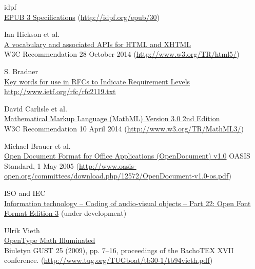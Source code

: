 \begin{thebibliography}{25}
idpf \\
\href{http://idpf.org/epub/30}{EPUB 3 Specifications}
(\href{http://idpf.org/epub/30}{http://idpf.org/epub/30})

Ian Hickson et al. \\
\href{http://www.w3.org/TR/html5/}{A vocabulary and associated APIs for HTML and XHTML} \\
W3C Recommendation 28 October 2014 (\href{http://www.w3.org/TR/html5/}{http://www.w3.org/TR/html5/})

S. Bradner \\
\href{http://www.ietf.org/rfc/rfc2119.txt}{Key words for use in RFCs to Indicate Requirement Levels} \\
\href{http://www.ietf.org/rfc/rfc2119.txt}{http://www.ietf.org/rfc/rfc2119.txt}

David Carlisle et al. \\
\href{http://www.w3.org/TR/MathML3/}{Mathematical Markup Language (MathML) Version 3.0 2nd Edition} \\
W3C Recommendation 10 April 2014 (\href{http://www.w3.org/TR/MathML3/}{http://www.w3.org/TR/MathML3/})

Michael Brauer et al. \\
\href{http://www.oasis-open.org/committees/download.php/12572/OpenDocument-v1.0-os.pdf}{Open Document Format for Office Applications (OpenDocument) v1.0}
OASIS Standard, 1 May 2005 (\href{http://www.oasis-open.org/committees/download.php/12572/OpenDocument-v1.0-os.pdf}{http://www.oasis-open.org/committees/download.php/12572/OpenDocument-v1.0-os.pdf})

ISO and IEC \\
\href{http://www.iso.org/iso/home/store/catalogue\_ics/catalogue\_detail\_ics.htm?csnumber=66391}{Information technology -- Coding of audio-visual objects -- Part 22: Open Font Format Edition 3} (under development)

Ulrik Vieth \\
\href{http://www.tug.org/TUGboat/tb30-1/tb94vieth.pdf}{OpenType Math Illuminated} \\
Biuletyn GUST 25 (2009), pp. 7–16, proceedings of the BachoTEX XVII conference.
(\href{http://www.tug.org/TUGboat/tb30-1/tb94vieth.pdf}{http://www.tug.org/TUGboat/tb30-1/tb94vieth.pdf})


\end{thebibliography}
